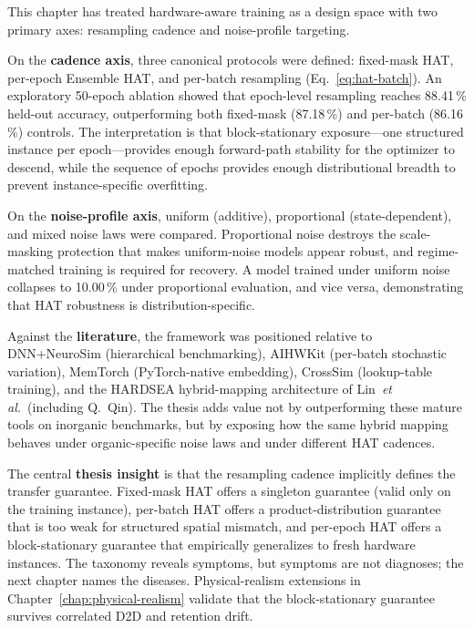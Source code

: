 This chapter has treated hardware-aware training as a design space with two primary axes: resampling cadence and noise-profile targeting.

On the \textbf{cadence axis}, three canonical protocols were defined: fixed-mask HAT, per-epoch Ensemble HAT, and per-batch resampling (Eq.~\ref{eq:hat-batch}). An exploratory 50-epoch ablation showed that epoch-level resampling reaches 88.41\,\% held-out accuracy, outperforming both fixed-mask (87.18\,\%) and per-batch (86.16\,\%) controls. The interpretation is that block-stationary exposure---one structured instance per epoch---provides enough forward-path stability for the optimizer to descend, while the sequence of epochs provides enough distributional breadth to prevent instance-specific overfitting.

On the \textbf{noise-profile axis}, uniform (additive), proportional (state-dependent), and mixed noise laws were compared. Proportional noise destroys the scale-masking protection that makes uniform-noise models appear robust, and regime-matched training is required for recovery. A model trained under uniform noise collapses to 10.00\,\% under proportional evaluation, and vice versa, demonstrating that HAT robustness is distribution-specific.

Against the \textbf{literature}, the framework was positioned relative to DNN+NeuroSim (hierarchical benchmarking), AIHWKit (per-batch stochastic variation), MemTorch (PyTorch-native embedding), CrossSim (lookup-table training), and the HARDSEA hybrid-mapping architecture of Lin~\emph{et al.}~(including Q.~Qin). The thesis adds value not by outperforming these mature tools on inorganic benchmarks, but by exposing how the same hybrid mapping behaves under organic-specific noise laws and under different HAT cadences.

The central \textbf{thesis insight} is that the resampling cadence implicitly defines the transfer guarantee. Fixed-mask HAT offers a singleton guarantee (valid only on the training instance), per-batch HAT offers a product-distribution guarantee that is too weak for structured spatial mismatch, and per-epoch HAT offers a block-stationary guarantee that empirically generalizes to fresh hardware instances. The taxonomy reveals symptoms, but symptoms are not diagnoses; the next chapter names the diseases.  Physical-realism extensions in Chapter~\ref{chap:physical-realism} validate that the block-stationary guarantee survives correlated D2D and retention drift.
